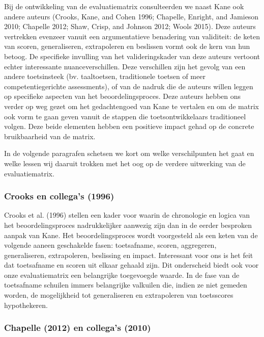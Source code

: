\documentclass[
  letterpaper,
]{report}
\begin{document}
Bij de ontwikkeling van de evaluatiematrix consulteerden we naast Kane
ook andere auteurs (Crooks, Kane, and Cohen 1996; Chapelle, Enright, and
Jamieson 2010; Chapelle 2012; Shaw, Crisp, and Johnson 2012; Wools
2015). Deze auteurs vertrekken evenzeer vanuit een argumentatieve
benadering van validiteit: de keten van scoren, generaliseren,
extrapoleren en beslissen vormt ook de kern van hun betoog. De
specifieke invulling van het valideringskader van deze auteurs vertoont
echter interessante nuanceverschillen. Deze verschillen zijn het gevolg
van een andere toetsinsteek (bv. taaltoetsen, traditionele toetsen of
meer competentiegerichte assessments), of van de nadruk die de auteurs
willen leggen op specifieke aspecten van het beoordelingsproces. Deze
auteurs hebben ons verder op weg gezet om het gedachtengoed van Kane te
vertalen en om de matrix ook vorm te gaan geven vanuit de stappen die
toetsontwikkelaars traditioneel volgen. Deze beide elementen hebben een
positieve impact gehad op de concrete bruikbaarheid van de matrix.

In de volgende paragrafen schetsen we kort om welke verschilpunten het
gaat en welke lessen wij daaruit trokken met het oog op de verdere
uitwerking van de evaluatiematrix.

\hypertarget{crooks-en-collegas-1996}{%
\subsubsection*{Crooks en collega's
(1996)}\label{crooks-en-collegas-1996}}

Crooks et al. (1996) stellen een kader voor waarin de chronologie en
logica van het beoordelingsproces nadrukkelijker aanwezig zijn dan in de
eerder besproken aanpak van Kane. Het beoordelingsproces wordt
voorgesteld als een keten van de volgende aaneen geschakelde fasen:
toetsafname, scoren, aggregeren, generaliseren, extrapoleren, beslissing
en impact. Interessant voor ons is het feit dat toetsafname en scoren
uit elkaar gehaald zijn. Dit onderscheid biedt ook voor onze
evaluatiematrix een belangrijke toegevoegde waarde. In de fase van de
toetsafname schuilen immers belangrijke valkuilen die, indien ze niet
gemeden worden, de mogelijkheid tot generaliseren en extrapoleren van
toetsscores hypothekeren.

\hypertarget{chapelle-2012-en-collegas-2010}{%
\subsubsection*{Chapelle (2012) en collega's
(2010)}\label{chapelle-2012-en-collegas-2010}}
\end{document}
